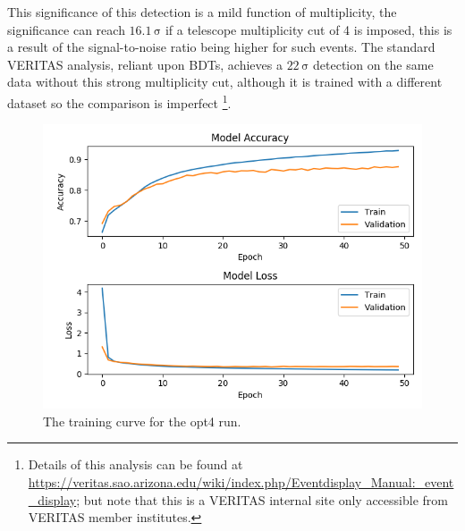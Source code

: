 \begin{table}[h]
    \centering
    \caption{Anasum output for the opt4 run, without applying a strenuous multiplicity cut.}
    \label{table:opt4}
\end{table}

This significance of this detection is a mild function of multiplicity, the significance can reach $\mathrm{16.1\,\sigma}$ if a telescope multiplicity cut of 4 is imposed, this is a result of the signal-to-noise ratio being higher for such events. The standard VERITAS analysis, reliant upon BDTs, achieves a $\mathrm{22\,\sigma}$ detection on the same data without this strong multiplicity cut, although it is trained with a different dataset so the comparison is imperfect \footnote{Details of this analysis can be found at \url{https://veritas.sao.arizona.edu/wiki/index.php/Eventdisplay_Manual:_event_display}; but note that this is a VERITAS internal site only accessible from VERITAS member institutes.}.

\begin{figure}[h] 
        \centering \includegraphics[width=\columnwidth]{figures/crabrun2opt4trainlog.png}

        \caption{
                \label{fig:opt4_trainlog} The training curve for the opt4 run.
        }
\end{figure}

